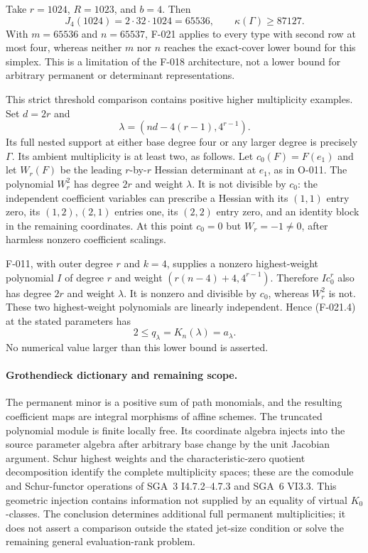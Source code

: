 Take \(r=1024\), \(R=1023\), and \(b=4\). Then
\[
 J_4(1024)=2\cdot32\cdot1024=65536,
                    \qquad \kappa(\Gamma)\geq87127.
\]
With \(m=65536\) and \(n=65537\), F-021 applies to
every type with second row at most four, whereas neither
\(m\) nor \(n\) reaches the exact-cover lower bound for
this simplex. This is a limitation of the F-018 architecture,
not a lower bound for arbitrary permanent or determinant
representations.

This strict threshold comparison contains positive higher
multiplicity examples. Set \(d=2r\) and
\[
                  \lambda=(nd-4(r-1),4^{r-1}).
                                                               \tag{F-021.4}
\]
Its full nested support at either base degree four or any
larger degree is precisely \(\Gamma\). Its ambient
multiplicity is at least two, as follows. Let \(c_0(F)=F(e_1)\)
and let \(W_r(F)\) be the leading \(r\)-by-\(r\)
Hessian determinant at \(e_1\), as in O-011.
The polynomial \(W_r^2\) has degree \(2r\) and weight
\(\lambda\). It is not divisible by \(c_0\): the independent
coefficient variables can prescribe a Hessian with its
\((1,1)\) entry zero, its \((1,2),(2,1)\) entries one,
its \((2,2)\) entry zero, and an identity block in the
remaining coordinates. At this point \(c_0=0\) but
\(W_r=-1\ne0\), after harmless nonzero coefficient scalings.

F-011, with outer degree \(r\) and \(k=4\), supplies
a nonzero highest-weight polynomial \(I\) of degree \(r\)
and weight \((r(n-4)+4,4^{r-1})\). Therefore
\(I c_0^r\) also has degree \(2r\) and weight \(\lambda\).
It is nonzero and divisible by \(c_0\), whereas \(W_r^2\)
is not. These two highest-weight polynomials are linearly
independent. Hence (F-021.4) at the stated parameters has
\[
                         2\leq q_\lambda=K_n(\lambda)=a_\lambda.
\]
No numerical value larger than this lower bound is asserted.

\paragraph{Grothendieck dictionary and remaining scope.}
The permanent minor is a positive sum of path monomials,
and the resulting coefficient maps are integral morphisms
of affine schemes. The truncated polynomial module is finite
locally free. Its coordinate algebra injects into the source
parameter algebra after arbitrary base change by the unit
Jacobian argument. Schur highest weights and the characteristic-zero
quotient decomposition identify the complete multiplicity spaces;
these are the comodule and Schur-functor operations of SGA~3
I4.7.2--4.7.3 and SGA~6 VI3.3. This geometric injection
contains information not supplied by an equality of virtual
\(K_0\)-classes. The conclusion determines additional full
permanent multiplicities; it does not assert a comparison
outside the stated jet-size condition or solve the remaining
general evaluation-rank problem.
